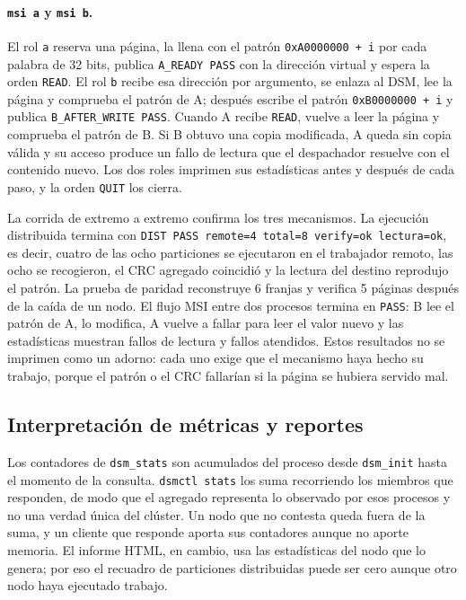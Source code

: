 \paragraph{\texttt{msi a} y \texttt{msi b}.} El rol \texttt{a} reserva una página, la llena con el patrón \texttt{0xA0000000 + i} por cada palabra de 32 bits, publica \texttt{A\_READY PASS} con la dirección virtual y espera la orden \texttt{READ}. El rol \texttt{b} recibe esa dirección por argumento, se enlaza al DSM, lee la página y comprueba el patrón de A; después escribe el patrón \texttt{0xB0000000 + i} y publica \texttt{B\_AFTER\_WRITE PASS}. Cuando A recibe \texttt{READ}, vuelve a leer la página y comprueba el patrón de B. Si B obtuvo una copia modificada, A queda sin copia válida y su acceso produce un fallo de lectura que el despachador resuelve con el contenido nuevo. Los dos roles imprimen sus estadísticas antes y después de cada paso, y la orden \texttt{QUIT} los cierra.

La corrida de extremo a extremo confirma los tres mecanismos. La ejecución distribuida termina con \texttt{DIST PASS remote=4 total=8 verify=ok lectura=ok}, es decir, cuatro de las ocho particiones se ejecutaron en el trabajador remoto, las ocho se recogieron, el CRC agregado coincidió y la lectura del destino reprodujo el patrón. La prueba de paridad reconstruye 6 franjas y verifica 5 páginas después de la caída de un nodo. El flujo MSI entre dos procesos termina en \texttt{PASS}: B lee el patrón de A, lo modifica, A vuelve a fallar para leer el valor nuevo y las estadísticas muestran fallos de lectura y fallos atendidos. Estos resultados no se imprimen como un adorno: cada uno exige que el mecanismo haya hecho su trabajo, porque el patrón o el CRC fallarían si la página se hubiera servido mal.

\subsection{Interpretación de métricas y reportes}\label{sec:metricas}

Los contadores de \texttt{dsm\_stats} son acumulados del proceso desde \texttt{dsm\_init} hasta el momento de la consulta. \texttt{dsmctl stats} los suma recorriendo los miembros que responden, de modo que el agregado representa lo observado por esos procesos y no una verdad única del clúster. Un nodo que no contesta queda fuera de la suma, y un cliente que responde aporta sus contadores aunque no aporte memoria. El informe HTML, en cambio, usa las estadísticas del nodo que lo genera; por eso el recuadro de particiones distribuidas puede ser cero aunque otro nodo haya ejecutado trabajo.

